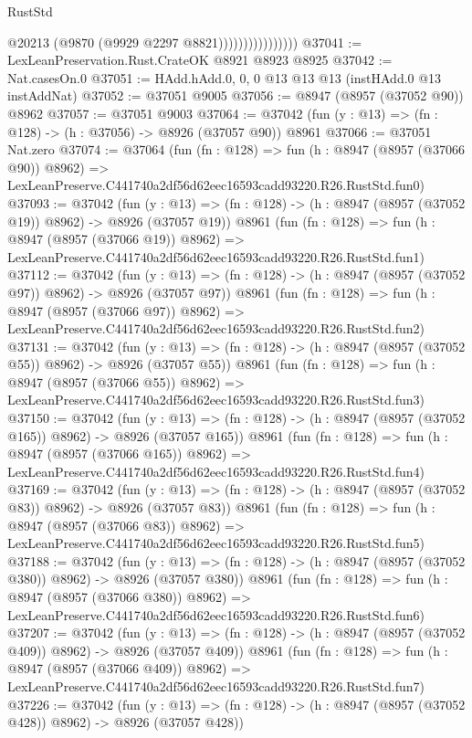 \begin{lexlean}{RustStd}
\begin{coremodule}
                                @20213
                                (@9870 (@9929 @2297 @8821))))))))))))))))
@37041 := LexLeanPreservation.Rust.CrateOK @8921 @8923 @8925
@37042 := Nat.casesOn.{0}
@37051 := HAdd.hAdd.{0, 0, 0} @13 @13 @13 (instHAdd.{0} @13 instAddNat)
@37052 := @37051 @9005
@37056 := @8947 (@8957 (@37052 @90)) @8962
@37057 := @37051 @9003
@37064 := @37042 (fun (y : @13) => (fn : @128) -> (h : @37056) -> @8926 (@37057 @90)) @8961
@37066 := @37051 Nat.zero
@37074 := @37064
    (fun (fn : @128) =>
    fun (h : @8947 (@8957 (@37066 @90)) @8962) =>
    LexLeanPreserve.C441740a2df56d62eec16593cadd93220.R26.RustStd.fun0)
@37093 := @37042
    (fun (y : @13) => (fn : @128) -> (h : @8947 (@8957 (@37052 @19)) @8962) -> @8926 (@37057 @19))
    @8961
    (fun (fn : @128) =>
    fun (h : @8947 (@8957 (@37066 @19)) @8962) =>
    LexLeanPreserve.C441740a2df56d62eec16593cadd93220.R26.RustStd.fun1)
@37112 := @37042
    (fun (y : @13) => (fn : @128) -> (h : @8947 (@8957 (@37052 @97)) @8962) -> @8926 (@37057 @97))
    @8961
    (fun (fn : @128) =>
    fun (h : @8947 (@8957 (@37066 @97)) @8962) =>
    LexLeanPreserve.C441740a2df56d62eec16593cadd93220.R26.RustStd.fun2)
@37131 := @37042
    (fun (y : @13) => (fn : @128) -> (h : @8947 (@8957 (@37052 @55)) @8962) -> @8926 (@37057 @55))
    @8961
    (fun (fn : @128) =>
    fun (h : @8947 (@8957 (@37066 @55)) @8962) =>
    LexLeanPreserve.C441740a2df56d62eec16593cadd93220.R26.RustStd.fun3)
@37150 := @37042
    (fun (y : @13) => (fn : @128) -> (h : @8947 (@8957 (@37052 @165)) @8962) -> @8926 (@37057 @165))
    @8961
    (fun (fn : @128) =>
    fun (h : @8947 (@8957 (@37066 @165)) @8962) =>
    LexLeanPreserve.C441740a2df56d62eec16593cadd93220.R26.RustStd.fun4)
@37169 := @37042
    (fun (y : @13) => (fn : @128) -> (h : @8947 (@8957 (@37052 @83)) @8962) -> @8926 (@37057 @83))
    @8961
    (fun (fn : @128) =>
    fun (h : @8947 (@8957 (@37066 @83)) @8962) =>
    LexLeanPreserve.C441740a2df56d62eec16593cadd93220.R26.RustStd.fun5)
@37188 := @37042
    (fun (y : @13) => (fn : @128) -> (h : @8947 (@8957 (@37052 @380)) @8962) -> @8926 (@37057 @380))
    @8961
    (fun (fn : @128) =>
    fun (h : @8947 (@8957 (@37066 @380)) @8962) =>
    LexLeanPreserve.C441740a2df56d62eec16593cadd93220.R26.RustStd.fun6)
@37207 := @37042
    (fun (y : @13) => (fn : @128) -> (h : @8947 (@8957 (@37052 @409)) @8962) -> @8926 (@37057 @409))
    @8961
    (fun (fn : @128) =>
    fun (h : @8947 (@8957 (@37066 @409)) @8962) =>
    LexLeanPreserve.C441740a2df56d62eec16593cadd93220.R26.RustStd.fun7)
@37226 := @37042
    (fun (y : @13) => (fn : @128) -> (h : @8947 (@8957 (@37052 @428)) @8962) -> @8926 (@37057 @428))

\end{coremodule}
\end{lexlean}
